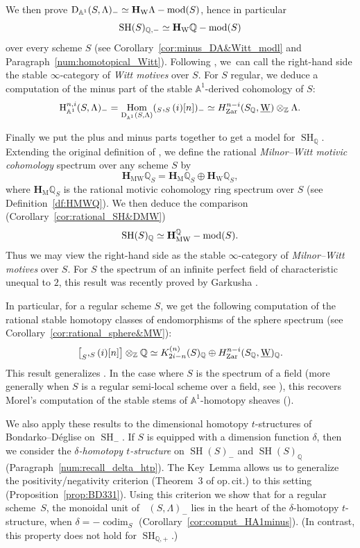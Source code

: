 \documentclass[11pt]{article}
\makeatletter
\numberwithin{equation}{section}\renewcommand{\encodingdefault}{TU}
\newcommand{\tstructure}{$t$-structure\xspace}
\newcommand{\tstructures}{$t$-structures\xspace}
\DeclareRobustCommand{\mathbbm}[1]{\csname jepbb@#1\endcsname}
\newcommand{\modl}[1]{#1\textnormal{-}\mathrm{mod}}
\renewcommand{\AA}{\mathbb A}
\newcommand{\un}{\mathbbm 1}
\newcommand{\uW}{\underline{\mathrm W}}
\newcommand{\HM}{\mathbf H_{\mathrm{M}}}
\newcommand{\HMW}{\mathbf H_{\mathrm{MW}}}
\newcommand{\HW}{\mathbf H_{\mathrm{W}}}
\newcommand{\HA}{\mathrm H_{\AA^1}}
\DeclareMathOperator{\codim}{codim}
\DeclareMathOperator{\SH}{SH}
\DeclareMathOperator{\DA}{D_{\AA^1}}
\DeclareMathOperator{\Hom}{Hom}
\newcommand{\ZZ} {\mathbb Z}
\newcommand{\QQ} {\mathbb Q}
\newcommand{\zar}{\mathrm{Zar}}
\theoremstyle{remark}
\theoremstyle{definition}
\numberwithin{equation}{thm}
\makeatother
\begin{document}
We then prove $\DA(S, \Lambda)_- \simeq \modl{\HW \Lambda}(S)$, hence in particular
\[
\SH(S)_{\QQ,-} \simeq \modl{\HW \QQ}(S)
\]
over every scheme $S$ (see Corollary~\ref{cor:minus_DA&Witt_modl} and Paragraph~\ref{num:homotopical_Witt}).
Following \cite{ALP}, we~can call the right-hand side the stable $\infty$-category of \emph{Witt motives} over $S$.
For $S$ regular, we deduce a computation of the minus part of the stable $\AA^1$-derived cohomology of $S$:
\[
\HA^{n,i}(S,\Lambda)_-
= \Hom_{\DA(S,\Lambda)}(\un_S,\un_S(i)[n])_- \simeq H^{n-i}_\zar(S_\QQ,\uW) \otimes_\ZZ \Lambda.
\]

Finally we put the plus and minus parts together to get a model for $\SH_\QQ$.
Extending the original definition of \cite[Chap.\,6]{BCDFO}, we define the rational \emph{Milnor--Witt motivic cohomology} spectrum over any scheme $S$ by
\[
\HMW \QQ_S=\HM \QQ_S \oplus \HW \QQ_S,
\]
where $\HM \QQ_S$ is the rational motivic cohomology ring spectrum over $S$ (see Definition~\ref{df:HMWQ}).
We then deduce the comparison (Corollary~\ref{cor:rational_SH&DMW})
\[
\SH(S)_{\QQ} \simeq \modl{\HMW^\QQ}(S).
\]
Thus we may view the right-hand side as the stable $\infty$-category of \emph{Milnor--Witt motives} over $S$.
For $S$ the spectrum of an infinite perfect field of characteristic unequal to $2$, this result was recently proved by Garkusha \cite{Garkusha}.

In particular, for a regular scheme $S$, we get the following computation
of the ratio\-nal stable homotopy classes of endomorphisms of the sphere spectrum (see Corollary~\ref{cor:rational_sphere&MW}):
\[
\big[\un_S,\un_S(i)[n]\big] \otimes_\ZZ \QQ \simeq K_{2i-n}^{(n)}(S)_\QQ \oplus H^{n-i}_\zar(S_\QQ,\uW)_\QQ.
\]
This result generalizes \cite[Rem.\,4.5]{ALP}. In the case where $S$ is the spectrum of a field (more generally when $S$ is a regular semi-local scheme over a field, see \cite[Th.\,10.12]{BachmannHoyois}), this recovers Morel's computation of the stable stems of $\mathbb{A}^1$-homotopy sheaves (\cite[Th.\,6.40]{MorelA1}).

We also apply these results to the dimensional homotopy \tstructures of Bondarko--Déglise \cite{BD1} on $\SH_-$.
If $S$ is equipped with a dimension function $\delta$, then we consider the \emph{$\delta$-homotopy \tstructure} on $\SH(S)_-$ and $\SH(S)_\QQ$ (Paragraph~\ref{num:recall_delta_htp}).
The Key~Lemma allows us to generalize the positivity/negativity criterion (Theorem~3 of op.\,cit.) to this setting (Proposition~\ref{prop:BD331}).
Using this criterion we show that for a regular scheme~$S$, the monoidal unit of $\DA(S,\Lambda)_-$ lies in the heart of the $\delta$-homotopy \tstructure, when $\delta=-\codim_S$ (Corollary~\ref{cor:comput_HA1minus}).
(In contrast, this property does not hold for $\SH_{\QQ,+}$.)
\end{document}
